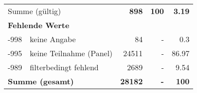 \begin{longtable}{lXrrr}
     \midrule
     \multicolumn{2}{l}{Summe (gültig)} &
       \textbf{\num{898}} &
     \textbf{100} &
       \textbf{\num[round-mode=places,round-precision=2]{3,19}} \\
     \multicolumn{5}{l}{\textbf{Fehlende Werte}}\\
       -998 &
       keine Angabe &
         \num{84} &
        - &
         \num[round-mode=places,round-precision=2]{0,3} \\
       -995 &
       keine Teilnahme (Panel) &
         \num{24511} &
        - &
         \num[round-mode=places,round-precision=2]{86,97} \\
       -989 &
       filterbedingt fehlend &
         \num{2689} &
        - &
         \num[round-mode=places,round-precision=2]{9,54} \\
     \midrule
     \multicolumn{2}{l}{\textbf{Summe (gesamt)}} &
          \textbf{\num{28182}} &
        \textbf{-} &
        \textbf{100} \\
     \bottomrule
     \end{longtable}
     
